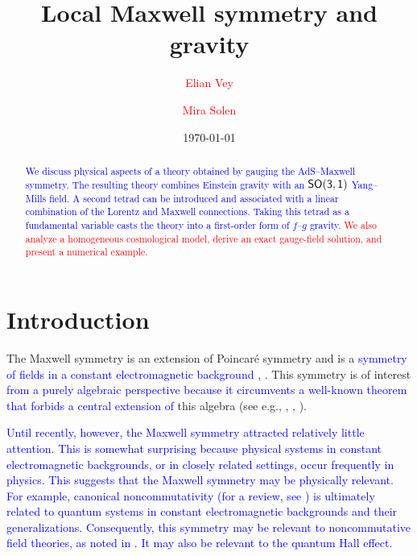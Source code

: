 \documentclass [prd,reprint,eqsecnum,nofootinbib]  {revtex4-1}
\newcommand{\lang}[1]{\textcolor{blue}{#1}}
\newcommand{\science}[1]{\textcolor{red}{#1}}
\begin{document}
\title{%
Local Maxwell symmetry and gravity}
\author{\science{Elian Vey}}
\affiliation{\science{Institute for Theoretical Cosmology, University of
Asterion, 1 Nebula Way, Asterion}}
\author{\science{Mira Solen}}
\affiliation{\science{Institute for Theoretical Cosmology, University of
Asterion, 1 Nebula Way, Asterion}}
\date{\today}
\begin{abstract}\noindent
\lang{We discuss physical aspects of a theory obtained by gauging the
AdS--Maxwell symmetry. The resulting theory combines Einstein gravity
with an $\sf{SO(3,1)}$ Yang--Mills field. A second tetrad can be
introduced and associated with a linear combination of the Lorentz
and Maxwell connections. Taking this tetrad as a fundamental
variable casts the theory into a first-order form of $f$--$g$
gravity.}
\science{We also analyze a homogeneous cosmological model, derive an
exact gauge-field solution, and present a numerical example.}
\end{abstract}
\maketitle

\section{Introduction}

The Maxwell symmetry is an extension of Poincar\'e symmetry and is a
\lang{symmetry of fields in a constant electromagnetic background}
\cite{Bacry:1970ye}, \cite{Schrader:1972zd}. This symmetry is of
interest \lang{from a purely algebraic perspective because it
circumvents a well-known theorem that forbids a central extension of}
this algebra (see e.g., \cite{Galindo:1967}, \cite{Soroka:2011tc},
\cite{Gomis:2009dm}).

\lang{Until recently, however, the Maxwell symmetry attracted
relatively little attention. This is somewhat surprising because
physical systems in constant electromagnetic backgrounds, or in
closely related settings, occur frequently in physics. This suggests
that the Maxwell symmetry may be physically relevant. For example,
canonical noncommutativity (for a review, see
\cite{Douglas:2001ba}) is ultimately related to quantum systems in
constant electromagnetic backgrounds and their generalizations.
Consequently, this symmetry may be relevant to noncommutative field
theories, as noted in \cite{Doplicher:1994tu}. It may also be
relevant to the quantum Hall effect.}
\end{document}
